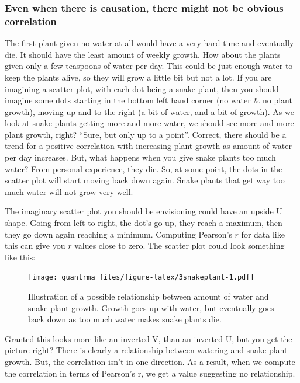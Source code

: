 \documentclass[
]{book}
\begin{document}
\hypertarget{even-when-there-is-causation-there-might-not-be-obvious-correlation}{%
\subsubsection{Even when there is causation, there might not be obvious correlation}\label{even-when-there-is-causation-there-might-not-be-obvious-correlation}}

The first plant given no water at all would have a very hard time and eventually die. It should have the least amount of weekly growth. How about the plants given only a few teaspoons of water per day. This could be just enough water to keep the plants alive, so they will grow a little bit but not a lot. If you are imagining a scatter plot, with each dot being a snake plant, then you should imagine some dots starting in the bottom left hand corner (no water \& no plant growth), moving up and to the right (a bit of water, and a bit of growth). As we look at snake plants getting more and more water, we should see more and more plant growth, right? ``Sure, but only up to a point''. Correct, there should be a trend for a positive correlation with increasing plant growth as amount of water per day increases. But, what happens when you give snake plants too much water? From personal experience, they die. So, at some point, the dots in the scatter plot will start moving back down again. Snake plants that get way too much water will not grow very well.

The imaginary scatter plot you should be envisioning could have an upside U shape. Going from left to right, the dot's go up, they reach a maximum, then they go down again reaching a minimum. Computing Pearson's \(r\) for data like this can give you \(r\) values close to zero. The scatter plot could look something like this:

\begin{figure}
\centering
\texttt{[image: quantrma\_files/figure-latex/3snakeplant-1.pdf]}
\caption{\label{fig:3snakeplant}Illustration of a possible relationship between amount of water and snake plant growth. Growth goes up with water, but eventually goes back down as too much water makes snake plants die.}
\end{figure}

Granted this looks more like an inverted V, than an inverted U, but you get the picture right? There is clearly a relationship between watering and snake plant growth. But, the correlation isn't in one direction. As a result, when we compute the correlation in terms of Pearson's r, we get a value suggesting no relationship.
\end{document}
